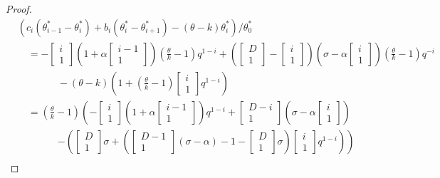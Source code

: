 \documentclass[
]{book}
\theoremstyle{definition}
\theoremstyle{definition}
\theoremstyle{definition}
\theoremstyle{definition}
\theoremstyle{remark}
\begin{document}
\begin{proof}
\begin{align}
& (c_i(\theta^*_{i-1}-\theta^*_i) + b_i(\theta^*_i -\theta^*_{i+1}) - (\theta-k) \theta^*_i)/\theta^*_0\\
& \quad = -\begin{bmatrix}{i}\\{1}\end{bmatrix}\left(1+\alpha \begin{bmatrix}{i-1}\\{1}\end{bmatrix}\right)\left(\frac{\theta}{k}-1\right)q^{1-i} + \left(\begin{bmatrix}{D}\\{1}\end{bmatrix}-\begin{bmatrix}{i}\\{1}\end{bmatrix}\right)\left(\sigma- \alpha \begin{bmatrix}{i}\\{1}\end{bmatrix}\right)\left(\frac{\theta}{k}-1\right)q^{-i}\\
& \qquad\qquad -(\theta-k)\left(1+\left(\frac{\theta}{k}-1\right)\begin{bmatrix}{i}\\{1}\end{bmatrix}q^{1-i}\right)\\
& \quad = \left(\frac{\theta}{k}-1\right)\left(-\begin{bmatrix}{i}\\{1}\end{bmatrix}\left(1+
\alpha\begin{bmatrix}{i-1}\\{1}\end{bmatrix}\right)q^{1-i}+\begin{bmatrix}{D-i}\\{1}\end{bmatrix}\left(\sigma-\alpha \begin{bmatrix}{i}\\{1}\end{bmatrix}\right)\right.\\
& \qquad\qquad\left.-\left(\begin{bmatrix}{D}\\{1}\end{bmatrix}\sigma +  \left(\begin{bmatrix}{D-1}\\{1}\end{bmatrix}(\sigma-\alpha)-1-\begin{bmatrix}{D}\\{1}\end{bmatrix}\sigma\right)\begin{bmatrix}{i}\\{1}\end{bmatrix}q^{1-i}\right)\right)\\

\end{align}
\end{proof}
\end{document}
